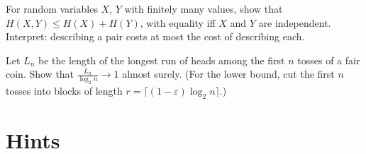 \begin{exercise}[$\star\star$]\label{ex:subadd}
For random variables $X$, $Y$ with finitely many values, show that $H(X,Y)\le H(X)+H(Y)$, with equality iff $X$ and $Y$ are
independent. Interpret: describing a pair costs at most the cost of describing each.
\end{exercise}

\begin{exercise}[$\star\star\star$]\label{ex:longestrun}
Let $L_n$ be the length of the longest run of heads among the first $n$ tosses of a fair coin. Show that $\frac{L_n}{\log_2n}\to1$
almost surely. (For the lower bound, cut the first $n$ tosses into blocks of length $r=\lceil(1-\varepsilon)\log_2n\rceil$.)
\end{exercise}

\section{Hints}

